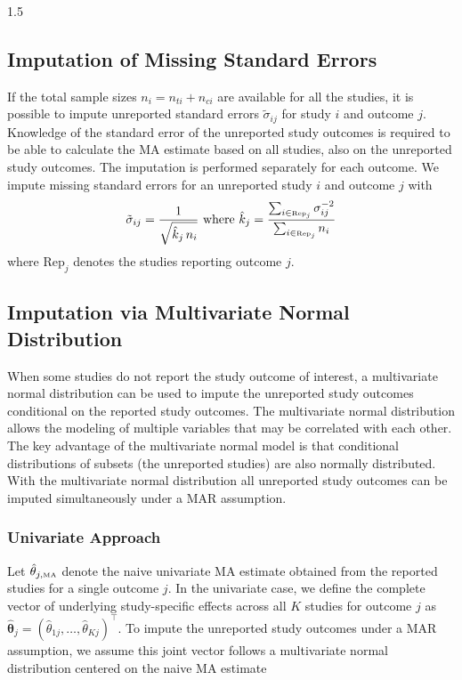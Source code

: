 \documentclass{article}
\begin{document}
\begin{spacing}{1.5}
\subsection{Imputation of Missing Standard Errors} \label{ImputationSE}

If the total sample sizes $n_i = n_{ti} + n_{ci}$ are available for all the studies, it is possible to impute unreported standard errors $\tilde\sigma_{ij}$ for study $i$ and outcome $j$. Knowledge of the standard error of the unreported study outcomes is required to be able to calculate the MA estimate based on all studies, also on the unreported study outcomes. The imputation is performed separately for each outcome. We impute missing standard errors for an unreported study $i$ and outcome $j$ with \cite{copas2014model}
\begin{equation} \label{eq:missingVar}
\tilde\sigma_{ij} = \frac{1}{\sqrt{\hat k_j \, n_i}} \mbox{ where } \hat k_j  = \frac{\sum_{i \in \mbox{\tiny{Rep}}_j} \sigma_{ij} ^{-2}}{\sum_{i \in \mbox{\tiny{Rep}}_j} n_i}
\end{equation}
where $\text{Rep}_j$ denotes the studies reporting outcome $j$.

\subsection{Imputation via Multivariate Normal Distribution}
\label{ImputationMVN}

When some studies do not report the study outcome of interest, a multivariate normal distribution can be used to impute the unreported study outcomes conditional on the reported study outcomes. The multivariate normal distribution allows the modeling of multiple variables that may be correlated with each other. The key advantage of the multivariate normal model is that conditional distributions of subsets (\eg the unreported studies) are also normally distributed. With the multivariate normal distribution all unreported study outcomes can be imputed simultaneously under a MAR assumption. 

\subsubsection{Univariate Approach} 
\label{univariateMVN}

Let $\hat{\theta}_{j,\tiny{\mbox{MA}}}$ denote the naive univariate MA estimate obtained from the reported studies for a single outcome $j$. In the univariate case, we define the complete vector of underlying study-specific effects across all $K$ studies for outcome $j$ as $\widehat{\boldsymbol{\theta}}_j = (\hat{\theta}_{1j}, \dots, \hat{\theta}_{Kj})^\top$. To impute the unreported study outcomes under a MAR assumption, we assume this joint vector follows a multivariate normal distribution centered on the naive MA estimate


\end{spacing}
\end{document}
